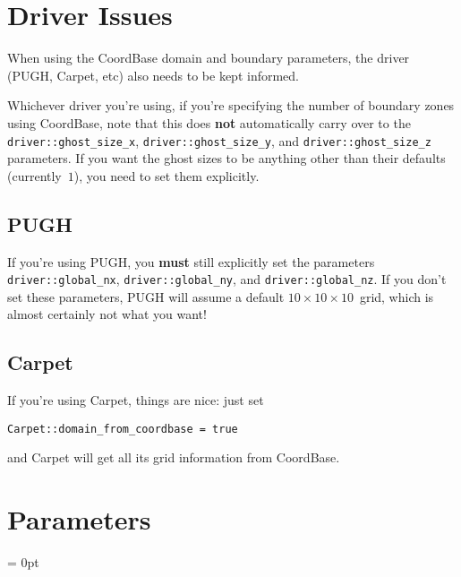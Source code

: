\section{Driver Issues}

When using the CoordBase domain and boundary parameters, the driver
(PUGH, Carpet, etc) also needs to be kept informed.

Whichever driver you're using, if you're specifying the number of boundary
zones using CoordBase, note that this does \textbf{not} automatically
carry over to the \verb|driver::ghost_size_x|, \verb|driver::ghost_size_y|,
and \verb|driver::ghost_size_z| parameters.  If you want the ghost sizes
to be anything other than their defaults (currently~$1$), you need to set
them explicitly.

\subsection{PUGH}

If you're using PUGH, you \textbf{must} still explicitly set the
parameters \verb|driver::global_nx|, \verb|driver::global_ny|,
and \verb|driver::global_nz|.  If you don't set these parameters,
PUGH will assume a default $10 \times 10 \times 10$~grid, which is
almost certainly not what you want!

\subsection{Carpet}

If you're using Carpet, things are nice:  just set
\begin{verbatim}
Carpet::domain_from_coordbase = true
\end{verbatim}
and Carpet will get all its grid information from CoordBase.




\section{Parameters} 


\parskip = 0pt

\setlength{\tableWidth}{160mm}

\setlength{\paraWidth}{\tableWidth}
\setlength{\descWidth}{\tableWidth}
\settowidth{\maxVarWidth}{boundary\_staggered\_x\_lower}

\addtolength{\paraWidth}{-\maxVarWidth}
\addtolength{\paraWidth}{-\columnsep}
\addtolength{\paraWidth}{-\columnsep}
\addtolength{\paraWidth}{-\columnsep}

